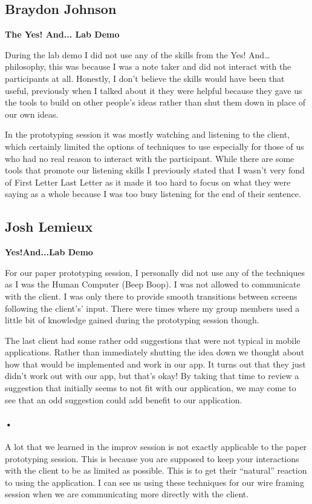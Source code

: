 \documentclass[12pt,letterpaper]{article}
\begin{document}
\clearpage
\subsection{Braydon Johnson}
\textbf{The Yes! And... Lab Demo}\par
During the lab demo I did not use any of the skills from the Yes! And… philosophy, this was because I was a note taker and did not interact with the participants at all. Honestly, I don’t believe the skills would have been that useful, previously when I talked about it they were helpful because they gave us the tools to build on other people’s ideas rather than shut them down in place of our own ideas.\par
In the prototyping session it was mostly watching and listening to the client, which certainly limited the options of techniques to use especially for those of us who had no real reason to interact with the participant. While there are some tools that promote our listening skills I previously stated that I wasn’t very fond of First Letter Last Letter as it made it too hard to focus on what they were saying as a whole because I was too busy listening for the end of their sentence. 

\clearpage
\subsection{Josh Lemieux}
\textbf{Yes!And...Lab Demo}\par
For our paper prototyping session, I personally did not use any of the techniques as I was the Human Computer (Beep Boop). I was not allowed to communicate with the client. I was only there to provide smooth transitions between screens following the client's’ input. There were times where my group members used a little bit of knowledge gained during the prototyping session though.\par
	The last client had some rather odd suggestions that were not typical in mobile applications. Rather than immediately shutting the idea down we thought about how that would be implemented and work in our app. It turns out that they just didn’t work out with our app, but that’s okay! By taking that time to review a suggestion that initially seems to not fit with our application, we may come to see that an odd suggestion could add benefit to our application.\paragraph{•}
      	A lot that we learned in the improv session is not exactly applicable to the paper prototyping session. This is because you are supposed to keep your interactions with the client to be as limited as possible. This is to get their “natural” reaction to using the application. I can see us using these techniques for our wire framing session when we are communicating more directly with the client.
\end{document}
